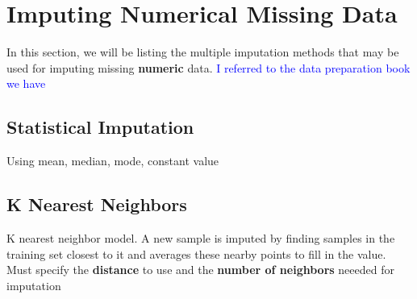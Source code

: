 \documentclass{article}
\begin{document}





\section{Imputing Numerical Missing Data}
In this section, we will be listing the multiple imputation methods that may be used for imputing missing \textbf{numeric} data. \textcolor{blue}{I referred to the data preparation book we have}

\subsection{Statistical Imputation}
Using mean, median, mode, constant value

\subsection{K Nearest Neighbors}
K nearest neighbor model. A new sample is imputed by finding samples in the training set closest to it and averages these nearby points to fill in the value. Must specify the \textbf{distance} to use and the \textbf{number of neighbors} neeeded for imputation
\end{document}
